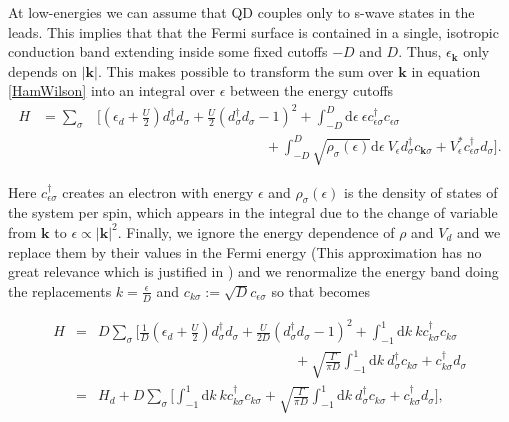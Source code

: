 At low-energies we can assume that QD couples only to s-wave states in the leads\citep{krishna-murthy_renormalization-group_1980}. This implies that that the Fermi surface is contained
in a single, isotropic conduction band extending inside some fixed cutoffs $-D$ and $D$. Thus, $\epsilon_{\mathbf{k}}$ only depends on $\left|\mathbf{k}\right|$. This makes possible to transform the sum over $\mathbf{k}$ in
equation \ref{HamWilson} into an integral over $\epsilon$ between
the energy cutoffs
\begin{eqnarray}
H & =\sum_{\sigma} & \Biggl[\left(\epsilon_{d}+\frac{U}{2}\right)d_{\sigma}^{\dagger}d_{\sigma}+\frac{U}{2}(d_{\sigma}^{\dagger}d_{\sigma}-1)^{2}+\int_{-D}^{D}\mbox{d}\epsilon\ \epsilon c_{\epsilon\sigma}^{\dagger}c_{\epsilon\sigma}\nonumber \\
 &  & \qquad\qquad\qquad\qquad\qquad\qquad+\int_{-D}^{D}\sqrt{\rho_{\sigma}(\epsilon)}\mbox{d}\epsilon\ V_{\epsilon}d_{\sigma}^{\dagger}c_{\mathbf{k}\sigma}+V_{\epsilon}^{*}c_{\epsilon\sigma}^{\dagger}d_{\sigma}\Biggr].\label{eq:hamEnergy}
\end{eqnarray}


Here $c_{\epsilon\sigma}^{\dagger}$ creates an electron with energy
$\epsilon$ and $\rho_{\sigma}(\epsilon)$ is the density of states
of the system per spin, which appears in the integral due to the change
of variable from $\mathbf{k}$ to $\epsilon\propto\left|\mathbf{k}\right|^{2}.$
Finally, we ignore the energy dependence of $\rho$ and $V_{d}$ and
we replace them by their values in the Fermi energy (This approximation
has no great relevance which is justified in \citep{krishna-murthy_renormalization-group_1980})
and we renormalize the energy band doing the replacements $k=\frac{\epsilon}{D}$
and $c_{k\sigma}:=\sqrt{D}c_{\epsilon\sigma}$ so that 
becomes

\begin{eqnarray}
H & = & D\sum_{\sigma}\Biggl[\frac{1}{D}\left(\epsilon_{d}+\frac{U}{2}\right)d_{\sigma}^{\dagger}d_{\sigma}+\frac{U}{2D}(d_{\sigma}^{\dagger}d_{\sigma}-1)^{2}+\int_{-1}^{1}\mbox{d}k\ kc_{k\sigma}^{\dagger}c_{k\sigma}\nonumber \\
 &  & \qquad\qquad\qquad\qquad\qquad\qquad\qquad+\sqrt{\frac{\Gamma}{\pi D}}\int_{-1}^{1}\mbox{d}k\ d_{\sigma}^{\dagger}c_{k\sigma}+c_{k\sigma}^{\dagger}d_{\sigma}\label{eq:Norm-HamEnergy}\\
 & = & H_{d}+D\sum_{\sigma}\Biggl[\int_{-1}^{1}\mbox{d}k\ kc_{k\sigma}^{\dagger}c_{k\sigma}+\sqrt{\frac{\Gamma}{\pi D}}\int_{-1}^{1}\mbox{d}k\ d_{\sigma}^{\dagger}c_{k\sigma}+c_{k\sigma}^{\dagger}d_{\sigma}\Biggr],
\end{eqnarray}


